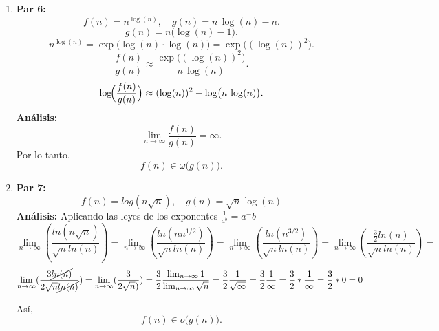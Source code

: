\documentclass[12pt]{article}
\begin{document}
\begin{enumerate}
  \item \textbf{Par 6:}
  \[
    f(n) = n^{\log(n)}, \quad g(n) = n \,\log(n) - n.
  \]
  \[
    g(n) = n\bigl(\log(n)-1\bigr).
  \]
  \[
    n^{\log(n)} = \exp\bigl(\log(n)\cdot\log(n)\bigr)= \exp\bigl((\log(n))^2\bigr).
  \]
  \[
    \frac{f(n)}{g(n)} \approx \frac{\exp\bigl((\log(n))^2\bigr)}{n\,\log(n)}.
  \]
  \[
    \log\!\Bigl(\frac{f(n)}{g(n)}\Bigr) \approx (\log(n))^2 - \log\bigl(n\,\log(n)\bigr).
  \]
  \textbf{Análisis:}
  \[
    \lim_{n\to\infty} \frac{f(n)}{g(n)} = \infty.
  \]
  Por lo tanto,
  \[
    f(n) \in \omega\bigl(g(n)\bigr).
  \]

  \item \textbf{Par 7:}
  \[
    f(n) = log(n\sqrt{n}), \quad g(n) = \sqrt{n} \log(n)
  \]
  \textbf{Análisis:}
  Aplicando las leyes de los exponentes $\frac{1}{a^b}=a^-b$
  \[
  \lim_{n \to \infty}(\frac{ln(n\sqrt{n})}{\sqrt{n}ln(n)}) = \lim_{n \to \infty}(\frac{ln(nn^{1/2})}{\sqrt{n}ln(n)}) = \lim_{n \to \infty}(\frac{ln(n^{3/2})}{\sqrt{n}ln(n)})= \lim_{n \to \infty}(\frac{\frac{3}{2}ln(n)}{\sqrt{n}ln(n)}) = 
  \]
  \[
  \lim_{n \to \infty}(\frac{3\cancel{ln(n)}}{2\sqrt{n}\cancel{ln(n)}}) = \lim_{n \to \infty}(\frac{3}{2\sqrt{n})}) = \frac{3}{2} \frac{\lim_{n \to \infty} 1}{\lim_{n \to \infty}\sqrt{n}} = \frac{3}{2}\frac{1}{\sqrt{\infty}} =\frac{3}{2} \frac{1}{\infty} = \frac{3}{2}*\frac{1}{\infty} = \frac{3}{2}*0 = 0
  \]
  
  Así,
  \[
    f(n) \in o\bigl(g(n)\bigr).
  \]


\end{enumerate}
\end{document}
